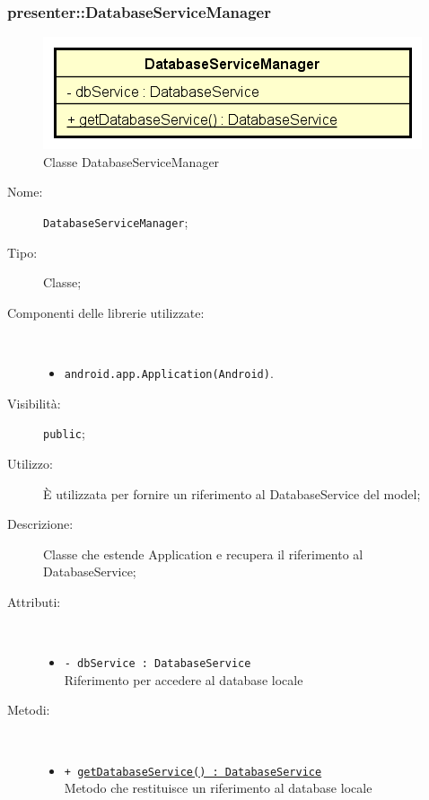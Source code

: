 \documentclass[../DefinizioneDiProdotto.tex]{subfiles}
\begin{document}
\subsubsection{presenter::DatabaseServiceManager}

    \begin{figure}[H]
        \centering
        \includegraphics{img/DatabaseServiceManager.png}
        \caption{Classe DatabaseServiceManager}\label{fig:presenter::DatabaseServiceManager} 
    \end{figure}
    \begin{description}
\item[Nome:] \texttt{DatabaseServiceManager};
\item[Tipo:] Classe;
\item[Componenti delle librerie utilizzate:] \
\begin{itemize}
\item \texttt{android.app.Application(Android)}.

\end{itemize}
\item[Visibilità:] \texttt{public};
\item[Utilizzo:] È utilizzata per fornire un riferimento al DatabaseService del model;
\item[Descrizione:] Classe che estende Application e recupera il riferimento al DatabaseService;
\item[Attributi:] \
\begin{itemize}
\item \texttt{- dbService : DatabaseService}\\
Riferimento per accedere al database locale

\end{itemize}
\item[Metodi:] \
\begin{itemize}
\item \texttt{+ \underline{getDatabaseService() : DatabaseService}}\\
Metodo che restituisce un riferimento al database locale
 \end{itemize}
\end{description}
\end{document}
